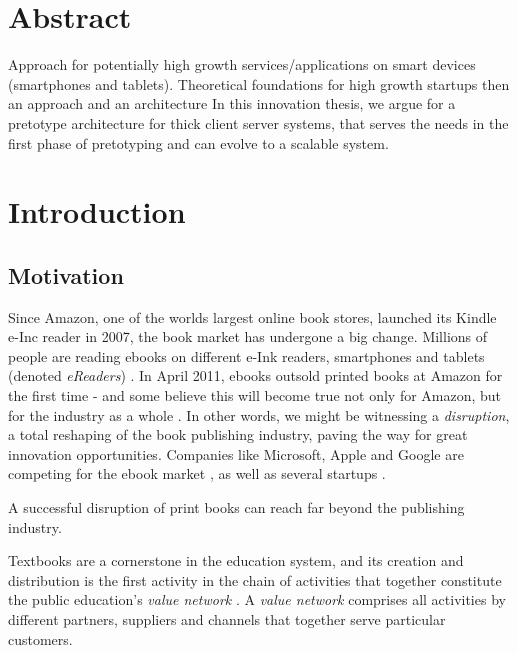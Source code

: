 \documentclass[a4paper,10pt]{book}
\begin{document}
\section{Abstract}
Approach for potentially high growth services/applications on smart devices (smartphones and tablets).
Theoretical foundations for high growth startups then an approach and an architecture 
In this innovation thesis, we argue for a pretotype architecture for thick client server systems, 
that serves the needs in the first phase of pretotyping and can evolve to a scalable system.


\tableofcontents

\newpage

\section{Introduction}

\subsection{Motivation}
Since Amazon, one of the worlds largest online book stores, launched its Kindle e-Inc reader in 2007, the book market has undergone a big change. 
Millions of people are reading ebooks on different e-Ink readers, smartphones and tablets (denoted \emph{eReaders}) \cite{1}\cite{2}\cite{3}\cite{4}\cite{adultEbookSecondLargestBookFormat}.
In April 2011, ebooks outsold printed books at Amazon for the first time \cite{amazonEbookSurpassedPrint} - and some 
believe this will become true not only for Amazon, 
but for the industry as a whole \cite{barnesEbookPassPrint}\cite{halfPreditEbookDominant2014}.
In other words, we might be witnessing a \emph{disruption}, a total reshaping of the book publishing industry, 
paving the way for great innovation opportunities. 
Companies like Microsoft, Apple and Google are competing for the ebook market \cite{microsoftInvestInNook}, as well as 
several startups \cite{startupEbookChegg}\cite{startupEbookInkling}\cite{startupEbookKno}.


A successful disruption of print books can reach far beyond the publishing industry.

Textbooks are a cornerstone in the education system, and its creation and distribution is the first activity in 
the chain of activities that together constitute the public education's 
\emph{value network} \cite{DisruptingClassExpandedEdition}. A \emph{value network} comprises all activities by different partners, 
suppliers and channels that together serve particular customers.
\end{document}
